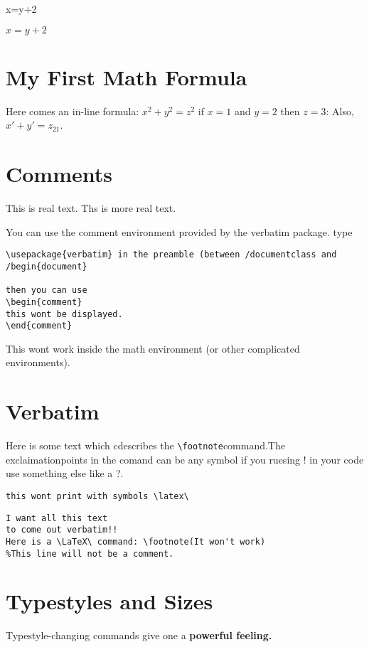 \documentclass[12pt,twoside,leqno]{article}%
\begin{document}
x=y+2

$x=y+2$
\section {My First Math Formula}
Here comes an in-line formula: $x^2+y^2=z^2$
if $x=1$ and $y=2$ then $z=3$:
Also, $x'+y' =z_{21}$.

\section{Comments}

This is real text. %
Ths is more real text.

You can use the comment environment provided by the verbatim package. type
\begin{verbatim}
\usepackage{verbatim} in the preamble (between /documentclass and /begin{document}

then you can use
\begin{comment}
this wont be displayed.
\end{comment}
\end{verbatim}
This wont work inside the math environment (or other complicated environments).

\section{Verbatim}
Here is some text which cdescribes the \verb!\footnote!command.The exclaimationpoints in the comand can be any symbol if you ruesing ! in your code use something else like a ?.

\verb!this wont print with symbols \latex\ !

\begin{verbatim}
I want all this text
to come out verbatim!!
Here is a \LaTeX\ command: \footnote(It won't work)
%This line will not be a comment.

\end{verbatim}
\section{Typestyles and Sizes}
Typestyle-changing commands give one a \bf powerful \rm feeling.
\end{document}
